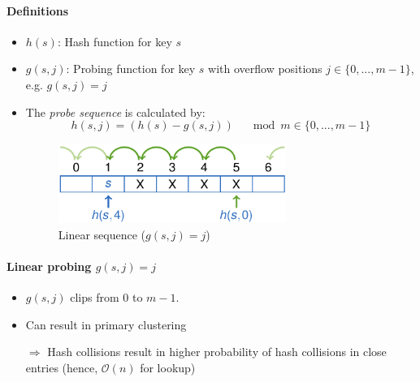 \documentclass[12pt, a4paper]{scrartcl}
\newcommand{\bigO}{\mathcal{O}}
\renewcommand{\implies}{\Rightarrow}
\begin{document}
\paragraph{Definitions}
\begin{itemize}
\item $h(s)$: Hash function for key $s$
\item $g(s,j)$: Probing function for key $s$ with overflow positions $j\in\{0,...,m-1\}$,\\ e.g. $g(s,j)=j$
\item The \emph{probe sequence} is calculated by:
  \begin{equation}
    \label{eq:probe_sequence}
    h(s,j)=(h(s)-g(s,j))\quad \mod m\in\{0,...,m-1\}
  \end{equation}
  \begin{figure}[!htbp]
    \centering
    \includegraphics[width=0.7\textwidth]{probe_sequence}
    \caption{Linear sequence ($g(s,j)=j$)}
    \label{fig:probe_sequence}
  \end{figure}
\end{itemize}

\paragraph{Linear probing $g(s,j)=j$}

\begin{itemize}
\item $g(s,j)$ clips from $0$ to $m-1$.
\item Can result in primary clustering 
\item[$\implies$] Hash collisions result in higher probability of hash collisions in close entries (hence, $\bigO(n)$ for lookup)
\end{itemize}
\end{document}
